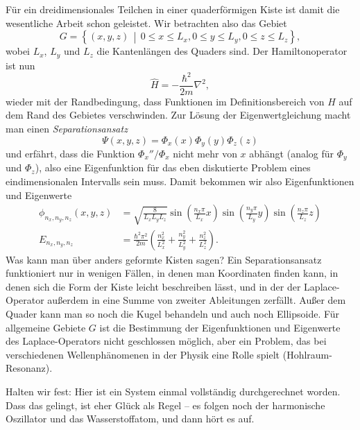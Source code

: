 Für ein dreidimensionales Teilchen in einer quaderförmigen Kiste ist damit die
wesentliche Arbeit schon geleistet. Wir betrachten also das Gebiet
\begin{equation}
	G = \left\{(x,y,z)\,\middle| \,  0\le x \le L_x, 0\le y \le L_y, 0\le z \le L_z  \right\},
\end{equation}
wobei $L_x$, $L_y$ und $L_z$ die Kantenlängen des Quaders sind. Der Hamiltonoperator ist
nun 
\begin{equation}
	\widehat{H} = -\frac{\hbar^2}{2m}\nabla^2,
\end{equation}
wieder mit der Randbedingung, dass Funktionen im Definitionsbereich von $H$ auf dem Rand des Gebietes verschwinden. Zur Lösung der Eigenwertgleichung macht man einen \emph{Separationsansatz}
\begin{equation}
	\Psi(x,y,z) = \Phi_x(x)\Phi_y(y)\Phi_z(z)
\end{equation}
und erfährt, dass die Funktion $\Phi_x''/\Phi_x$ nicht mehr von $x$ abhängt (analog für $\Phi_y$ und $\Phi_z$), also eine Eigenfunktion für das eben diskutierte Problem eines eindimensionalen Intervalls sein muss. Damit bekommen wir also Eigenfunktionen und Eigenwerte
\begin{align}
	\phi_{n_x,n_y,n_z}(x,y,z) &= \sqrt{\frac{8}{L_xL_yL_z}} \sin\left(\frac{n_x\pi}{L_x} x\right)\sin\left(\frac{n_y\pi}{L_y} y\right)\sin\left(\frac{n_z\pi}{L_z} z\right) \\
	E_{n_x,n_y,n_z}&=\frac{\hbar^2\pi^2}{2m} \left(\frac{n_x^2}{L_x^2} + \frac{n_y^2}{L_y^2} + \frac{n_z^2}{L_z^2} \right).
\end{align}
Was kann man über anders geformte Kisten sagen? Ein Separationsansatz funktioniert nur in wenigen Fällen, in denen man Koordinaten finden kann, in denen sich die Form der Kiste leicht beschreiben lässt, und in der der
Laplace-Operator außerdem in eine Summe von zweiter Ableitungen zerfällt. Außer dem Quader kann man so noch die Kugel behandeln und auch noch Ellipsoide. Für allgemeine Gebiete $G$ ist die Bestimmung der Eigenfunktionen
und Eigenwerte des Laplace-Operators nicht geschlossen möglich, aber ein Problem, das bei verschiedenen Wellenphänomenen in der Physik eine Rolle spielt (Hohlraum-Resonanz).

Halten wir fest: Hier ist ein System einmal vollständig durchgerechnet worden. Dass das gelingt, ist eher Glück als Regel -- es folgen noch der harmonische Oszillator und das Wasserstoffatom, und dann hört es auf.